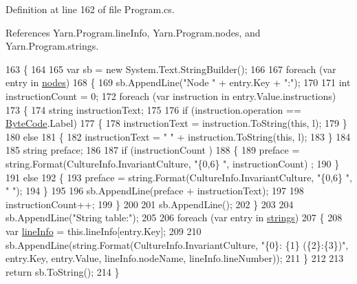 Definition at line 162 of file Program.\-cs.



References Yarn.\-Program.\-line\-Info, Yarn.\-Program.\-nodes, and Yarn.\-Program.\-strings.


\begin{DoxyCode}
163         \{
164 
165             var sb = \textcolor{keyword}{new} System.Text.StringBuilder();
166 
167             \textcolor{keywordflow}{foreach} (var entry \textcolor{keywordflow}{in} \hyperlink{a00152_a3f4928a577c88263ad016be259b175c4}{nodes})
168             \{
169                 sb.AppendLine(\textcolor{stringliteral}{"Node "} + entry.Key + \textcolor{stringliteral}{":"});
170 
171                 \textcolor{keywordtype}{int} instructionCount = 0;
172                 \textcolor{keywordflow}{foreach} (var instruction \textcolor{keywordflow}{in} entry.Value.instructions)
173                 \{
174                     \textcolor{keywordtype}{string} instructionText;
175 
176                     \textcolor{keywordflow}{if} (instruction.operation == \hyperlink{a00051_ad5dfb6ee68ca7469623ad3e459f98894}{ByteCode}.Label)
177                     \{
178                         instructionText = instruction.ToString(\textcolor{keyword}{this}, l);
179                     \}
180                     \textcolor{keywordflow}{else}
181                     \{
182                         instructionText = \textcolor{stringliteral}{"    "} + instruction.ToString(\textcolor{keyword}{this}, l);
183                     \}
184 
185                     \textcolor{keywordtype}{string} preface;
186 
187                     \textcolor{keywordflow}{if} (instructionCount %
      )
188                     \{
189                         preface = string.Format(CultureInfo.InvariantCulture, \textcolor{stringliteral}{"\{0,6\}   "}, instructionCount)
      ;
190                     \}
191                     \textcolor{keywordflow}{else}
192                     \{
193                         preface = string.Format(CultureInfo.InvariantCulture, \textcolor{stringliteral}{"\{0,6\}   "}, \textcolor{stringliteral}{" "});
194                     \}
195 
196                     sb.AppendLine(preface + instructionText);
197 
198                     instructionCount++;
199                 \}
200 
201                 sb.AppendLine();
202             \}
203 
204             sb.AppendLine(\textcolor{stringliteral}{"String table:"});
205 
206             \textcolor{keywordflow}{foreach} (var entry \textcolor{keywordflow}{in} \hyperlink{a00152_a59263e00cecfe36d9881b4c30b048f09}{strings})
207             \{
208                 var \hyperlink{a00152_a0d4da395947767b4a1eaaff8a9842adc}{lineInfo} = this.lineInfo[entry.Key];
209 
210                 sb.AppendLine(string.Format(CultureInfo.InvariantCulture, \textcolor{stringliteral}{"\{0\}: \{1\} (\{2\}:\{3\})"}, entry.Key, 
      entry.Value, lineInfo.nodeName, lineInfo.lineNumber));
211             \}
212 
213             \textcolor{keywordflow}{return} sb.ToString();
214         \}
\end{DoxyCode}
